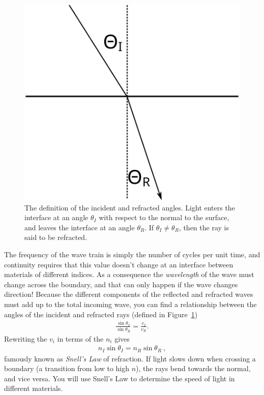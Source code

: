 \documentclass[12pt]{article}
\begin{document}
\begin{figure}
  \centering
  \includegraphics[width=\textwidth/3]{figures/refraction}  
  \caption{The definition of the incident and refracted angles.  Light
    enters the interface at an angle $\theta_I$ with respect to the
    normal to the surface, and leaves the interface at an angle
    $\theta_R$.  If $\theta_I \neq \theta_R$, then the ray is said to
    be refracted.}
  \label{fig:defs}
\end{figure}
The frequency of the wave train is simply the number of cycles per
unit time, and continuity requires that this value doesn't change at
an interface between materials of different indices.  As a consequence
the \textit{wavelength} of the wave must change across the boundary,
and that can only happen if the wave changes direction!  Because the
different components of the reflected and refracted waves must add up
to the total incoming wave, you can find a relationship between the
angles of the incident and refracted rays (defined in
Figure~\ref{fig:defs})
\begin{gather*}
  \frac{\sin \theta_I}{\sin \theta_R} = \frac{v_I}{v_R}.
\end{gather*}
Rewriting the $v_i$ in terms of the $n_i$ gives
\begin{gather*}
  n_I \sin\theta_I = n_R \sin\theta_R\ ,
\end{gather*}
famously known as \textit{Snell's Law} of refraction.  If light slows
down when crossing a boundary (a transition from low to high $n$), the
rays bend towards the normal, and vice versa.  You will use Snell's
Law to determine the speed of light in different materials.
\end{document}
